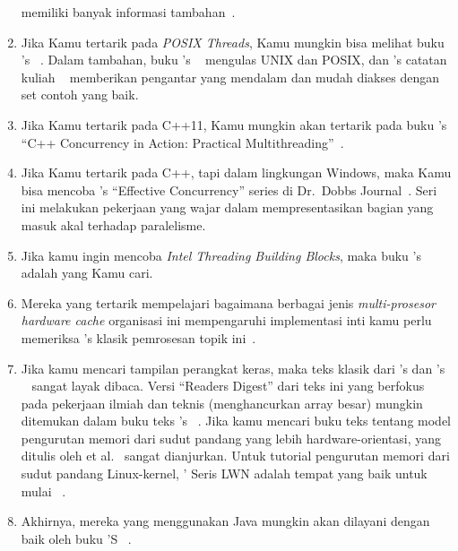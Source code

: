 \begin{enumerate}
	memiliki banyak informasi tambahan~\cite{AMD2020ROCm,CyrilZeller2011GPGPUbasics,NVidia2017GPGPU,NVidia2017GPGPU-university}.
\item	Jika Kamu tertarik pada {\it POSIX Threads}, Kamu mungkin bisa
	melihat buku 's ~\cite{Butenhof1997pthreads}.
	Dalam tambahan,
	buku 's ~\cite{WRichardStevens1992,WRichardStevens2013}
	mengulas UNIX dan POSIX, dan 's catatan kuliah
	~\cite{StewartWeiss2013UNIX} memberikan
	pengantar yang mendalam dan mudah diakses dengan set contoh yang baik.
\item	Jika Kamu tertarik pada C++11, Kamu mungkin akan tertarik pada buku
	's ``C++ Concurrency in Action:
	Practical Multithreading''~\cite{AnthonyWilliams2012,AnthonyWilliams2019}.
\item 	Jika Kamu tertarik pada C++, tapi dalam lingkungan Windows,
	maka Kamu bisa mencoba 's ``Effective Concurrency''
	series di
	Dr.~Dobbs Journal~\cite{HerbSutter2008EffectiveConcurrency}.
	Seri ini melakukan pekerjaan yang wajar dalam mempresentasikan
	bagian yang masuk akal terhadap paralelisme.
\item	Jika kamu ingin mencoba {\it Intel Threading Building Blocks},
	maka buku 's~\cite{Reinders2007Textbook}
	adalah yang Kamu cari.
\item	Mereka yang tertarik mempelajari bagaimana berbagai jenis {\it multi-prosesor
	hardware cache}
	organisasi ini mempengaruhi implementasi inti
	kamu perlu memeriksa 's klasik
	pemrosesan topik ini~\cite{Schimmel:1994:USM:175689}.
\item 	Jika kamu mencari tampilan perangkat keras,
	maka teks klasik dari 's dan 's
	~\cite{Hennessy2017,Hennessy2011} sangat layak dibaca.
	Versi ``Readers Digest'' dari teks ini yang berfokus pada
	pekerjaan ilmiah dan teknis (menghancurkan array besar)
	mungkin ditemukan dalam buku teks 's
	~\cite{AndrewChien2022ComputerArchitectureScientists}.
	Jika kamu mencari buku teks tentang model pengurutan memori
	dari sudut pandang yang lebih hardware-orientasi,
	yang ditulis oleh  et al.~\cite{DanielJSorin2011MemModel,%
	VijayNagarajan2020MemModel}
	sangat dianjurkan.
	Untuk tutorial pengurutan memori dari sudut pandang Linux-kernel,
	' Seris LWN adalah tempat yang baik untuk
	mulai ~\cite{PaoloBonzini2021lockless1,PaoloBonzini2021lockless2,PaoloBonzini2021lockless3,PaoloBonzini2021lockless4,PaoloBonzini2021lockless5,PaoloBonzini2021lockless6}.
\item 	Akhirnya, mereka yang menggunakan Java mungkin akan
	dilayani dengan baik oleh buku 'S
	~\cite{DougLea1997Textbook,Goetz2007Textbook}.
\end{enumerate}


